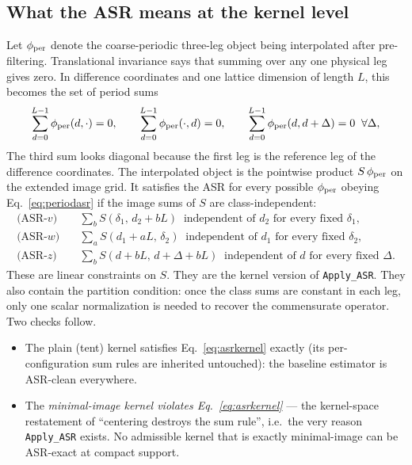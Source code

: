 \documentclass[11pt,a4paper]{article}
\begin{document}
\subsection{What the ASR means at the kernel level}
\label{sec:asr-kernel}

Let $\phi_{\rm per}$ denote the coarse-periodic three-leg object being
interpolated after pre-filtering.  Translational invariance says that
summing over any one physical leg gives zero.  In difference coordinates
and one lattice dimension of length $L$, this becomes the set of period
sums
\begin{equation}
\sum_{d=0}^{L-1} \phi_{\rm per}(d, \cdot) = 0, \qquad
\sum_{d=0}^{L-1} \phi_{\rm per}(\cdot, d) = 0, \qquad
\sum_{d=0}^{L-1} \phi_{\rm per}(d, d+\Delta) = 0 \;\;\forall\Delta,
\label{eq:periodasr}
\end{equation}
The third sum looks diagonal because the first leg is the reference leg of
the difference coordinates.  The interpolated object is the pointwise
product $S\,\phi_{\rm per}$ on the extended image grid.  It satisfies the
ASR for every possible $\phi_{\rm per}$ obeying Eq.~\eqref{eq:periodasr}
if the image sums of $S$ are class-independent:
\begin{align}
\text{(ASR-$v$)}\quad & \textstyle\sum_b S(\delta_1,\, d_2 + bL)
  \;\;\text{independent of } d_2 \text{ for every fixed } \delta_1,
  \nonumber\\
\text{(ASR-$w$)}\quad & \textstyle\sum_a S(d_1 + aL,\, \delta_2)
  \;\;\text{independent of } d_1 \text{ for every fixed } \delta_2,
  \label{eq:asrkernel}\\
\text{(ASR-$z$)}\quad & \textstyle\sum_b S(d + bL,\, d + \Delta + bL)
  \;\;\text{independent of } d \text{ for every fixed } \Delta.
  \nonumber
\end{align}
These are linear constraints on $S$.  They are the kernel version of
\texttt{Apply\_ASR}.  They also contain the partition condition: once the
class sums are constant in each leg, only one scalar normalization is needed
to recover the commensurate operator.  Two checks follow.
\begin{itemize}
\item The plain (tent) kernel satisfies Eq.~\eqref{eq:asrkernel}
exactly (its per-configuration sum rules are inherited untouched): the
baseline estimator is ASR-clean everywhere.
\item The \emph{minimal-image kernel violates
Eq.~\eqref{eq:asrkernel}} --- the kernel-space restatement of ``centering
destroys the sum rule'', i.e.\ the very reason \texttt{Apply\_ASR}
exists. No admissible kernel that is exactly minimal-image can be
ASR-exact at compact support.
\end{itemize}
\end{document}
